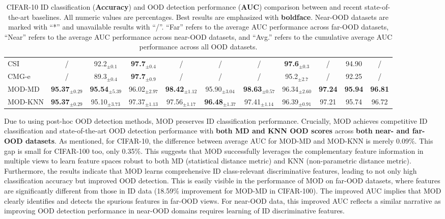 \begin{table}[h!]
{\begin{tabular}{|l|c|cccccc|ccc|}
CSI  & / & 92.2$_{\pm 0.1}$     & \textbf{97.7}$_{\pm 0.4}$  & /  & /   & /   & \multicolumn{1}{c|}{\textbf{97.6}$_{\pm 0.3}$} & / & 94.90 &  /   \\  
CMG-e   & /   & 89.3$_{\pm 0.4}$   & \textbf{97.7}$_{\pm 0.9}$  & / & /  & / & \multicolumn{1}{c|}{95.2$_{\pm 2.7}$}  & / & 92.25 &    /      \\  \hline
MOD-MD  & \textbf{95.37}$_{\pm 0.29}$ & \textbf{95.54}$_{\pm 5.39}$ & 96.02$_{\pm 2.97}$ & \textbf{98.42}$_{\pm 1.12}$ & 95.90$_{\pm 3.04}$ & \textbf{98.63}$_{\pm 0.57}$ & \multicolumn{1}{c|}{96.34$_{\pm 2.60}$}  & \textbf{97.24} & \textbf{95.94}  & \textbf{96.81}   \\ %
MOD-KNN  & \textbf{95.37}$_{\pm 0.29}$ & 95.10$_{\pm 3.73}$ & 97.37$_{\pm 1.13}$ & 97.56$_{\pm 1.17}$ & \textbf{96.48}$_{\pm 1.37}$ & 97.41$_{\pm 1.14}$ & \multicolumn{1}{c|}{96.39$_{\pm 0.91}$} & 97.21 & 95.74  &  96.72  \\ \hline
\end{tabular}
}
\caption{CIFAR-10 ID classification (\textbf{Accuracy}) and OOD detection performance (\textbf{AUC}) comparison between \sysa and recent state-of-the-art baselines. All numeric values are percentages. Best results are emphasized with \textbf{boldface}. Near-OOD datasets are marked with ``*'' and unavailable results with ``/''. ``Far'' refers to the average AUC performance across far-OOD datasets, ``Near'' refers to the average AUC performance across near-OOD datasets, and ``Avg.'' refers to the cumulative average AUC performance across all OOD datasets.
}
\label{tab:propwork-mod-results-cifar10}
\end{table}


Due to using post-hoc OOD detection methods, MOD preserves ID classification performance. Crucially, MOD achieves competitive ID classification and state-of-the-art OOD detection performance with \textbf{both MD and KNN OOD scores} across \textbf{both near- and far-OOD datasets}. As mentioned, for CIFAR-10, the difference between average AUC for MOD-MD and MOD-KNN is merely 0.09\%. This gap is small for CIFAR-100 too, only 0.35\%. This suggests that MOD successfully leverages the complementary feature information in multiple views to learn feature spaces robust to both MD (statistical distance metric) and KNN (non-parametric distance metric). Furthermore, the results indicate that MOD learns comprehensive ID class-relevant discriminative features, leading to not only high classification accuracy but improved OOD detection. This is easily visible in the performance of MOD on far-OOD datasets, where features are significantly different from those in ID data (18.59\% improvement for MOD-MD in CIFAR-100). The improved AUC implies that MOD clearly identifies and detects the spurious features in far-OOD views. For near-OOD data, this improved AUC reflects a similar narrative as improving OOD detection performance in near-OOD domains requires learning of ID discriminative features.
\vspace{3cm}

